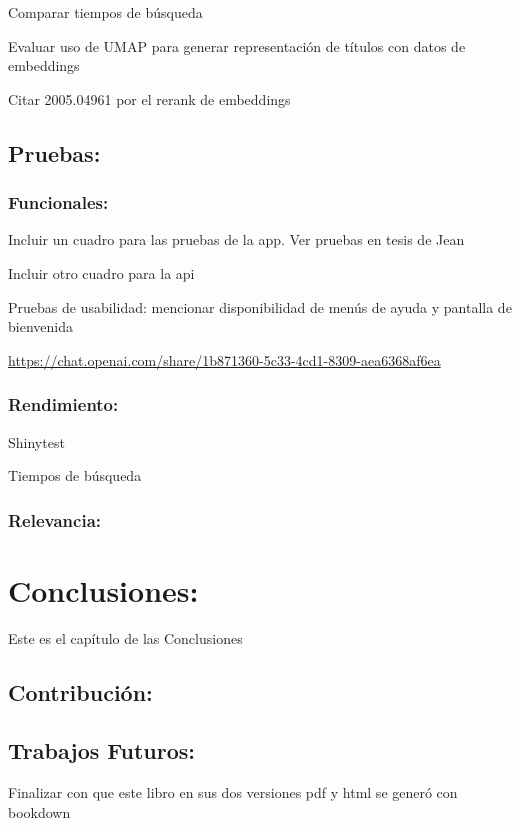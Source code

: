 \documentclass[
  12pt,
  openany]{book}
\begin{document}
Comparar tiempos de búsqueda

Evaluar uso de UMAP para generar representación de títulos con datos de embeddings

Citar 2005.04961 por el rerank de embeddings

\hypertarget{pruebas}{%
\section{Pruebas:}\label{pruebas}}

\hypertarget{pruebas1}{%
\subsection{Funcionales:}\label{pruebas1}}

Incluir un cuadro para las pruebas de la app. Ver pruebas en tesis de Jean

Incluir otro cuadro para la api

Pruebas de usabilidad: mencionar disponibilidad de menús de ayuda y pantalla de bienvenida

\url{https://chat.openai.com/share/1b871360-5c33-4cd1-8309-aea6368af6ea}

\hypertarget{pruebas2}{%
\subsection{Rendimiento:}\label{pruebas2}}

Shinytest

Tiempos de búsqueda

\hypertarget{pruebas3}{%
\subsection{Relevancia:}\label{pruebas3}}

\hypertarget{conclusiones}{%
\chapter{Conclusiones:}\label{conclusiones}}

Este es el capítulo de las Conclusiones

\hypertarget{conclusionescontri}{%
\section{Contribución:}\label{conclusionescontri}}

\hypertarget{conclusionestrabafutu}{%
\section{Trabajos Futuros:}\label{conclusionestrabafutu}}

Finalizar con que este libro en sus dos versiones pdf y html se generó con bookdown

  
\end{document}
